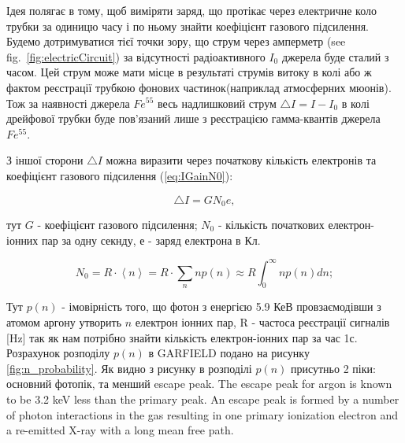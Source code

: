 \documentclass[pdftex,14pt]{scrartcl}
\def\mean#1{\left< #1 \right>}
\begin{document}
\begin{spacing}{1.5}
	Ідея полягає в тому, щоб виміряти заряд, що протікає через електричне коло трубки за одиницю часу і по ньому знайти коефіцієнт газового підсилення. Будемо дотримуватися тієї точки зору, що струм через амперметр  (see fig.~\ref{fig:electricCircuit}) за відсутності радіоактивного $I_0$ джерела буде сталий з часом. Цей струм може мати місце в результаті струмів витоку в колі або ж фактом реєстрації трубкою фонових частинок(наприклад атмосферних мюонів). Тож за наявності джерела $Fe^{55}$ весь надлишковий струм $\bigtriangleup I = I-I_0$ в колі  дрейфової трубки буде пов’язаний лише з реєстрацією гамма-квантів джерела $Fe^{55}$.
	
	З іншої сторони $\bigtriangleup I$  можна виразити через початкову кількість електронів та коефіцієнт газового підсилення (\ref{eq:IGainN0}):
	
	\begin{equation}
	\bigtriangleup I = G N_0 e,
	\label{eq:IGainN0}
	\end{equation}
	
	
	тут $G$ - коефіцієнт газового підсилення; $N_0$ - кількість початкових електрон-іонних пар за одну секнду, е - заряд електрона в Кл.
	
	\begin{equation}
	N_0 = R \cdot \mean{n} = R \cdot\sum_n n p(n) \approx R \int_0^\infty n p(n) dn;
	\end{equation}


	Тут $p(n)$ - імовірність того, що фотон з енергією 5.9 КеВ провзаємодівши з атомом аргону утворить $n$ електрон іонних пар, R - частоса реєстрації сигналів [Hz] так як нам потрібно знайти кількість електрон-іонних пар за час 1с.	
	Розрахунок розподілу $p(n)$ в GARFIELD подано на рисунку \ref{fig:n_probability}. Як видно з рисунку в розподілі $p(n)$ присутньо 2 піки: основний фотопік, та менший escape peak. 
	The escape peak for argon is known to be 3.2 keV less than the primary peak. An escape peak is formed by a number of photon interactions in the gas resulting in one primary ionization electron and a re-emitted X-ray with a long mean free path.
	

\end{spacing}
\end{document}
